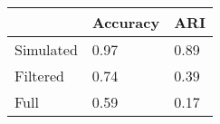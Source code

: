 \begin{tabular}{lll}
\toprule
{} & Accuracy &   ARI \\
\midrule
Simulated &     0.97 &  0.89 \\
Filtered  &     0.74 &  0.39 \\
Full      &     0.59 &  0.17 \\
\bottomrule
\end{tabular}
